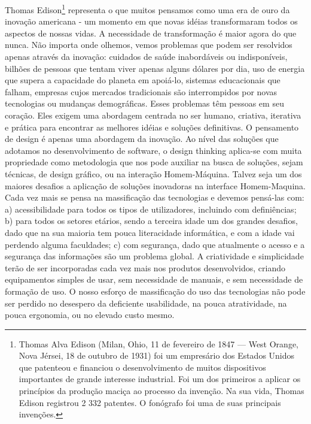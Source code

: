 \documentclass[twoside,twocolumn]{article}
\begin{document}
Thomas Edison\footnote{Thomas Alva Edison (Milan, Ohio, 11 de fevereiro de 1847 — West Orange, Nova Jérsei, 18 de outubro de 1931) foi um empresário dos Estados Unidos que patenteou e financiou o desenvolvimento de muitos dispositivos importantes de grande interesse industrial. Foi um dos primeiros a aplicar os princípios da produção maciça ao processo da invenção. Na sua vida, Thomas Edison registrou 2 332 patentes. O fonógrafo foi uma de suas principais invenções.} representa o que muitos pensamos como uma era de ouro da inovação americana - um momento em que novas idéias transformaram todos os aspectos de nossas vidas. A necessidade de transformação é maior agora do que nunca. Não importa onde olhemos, vemos problemas que podem ser resolvidos apenas através da inovação: cuidados de saúde inabordáveis ou indisponíveis, bilhões de pessoas que tentam viver apenas alguns dólares por dia, uso de energia que supera a capacidade do planeta em apoiá-lo, sistemas educacionais que falham, empresas cujos mercados tradicionais são interrompidos por novas tecnologias ou mudanças demográficas. Esses problemas têm pessoas em seu coração. Eles exigem uma abordagem centrada no ser humano, criativa, iterativa e prática para encontrar as melhores idéias e soluções definitivas. O pensamento de design é apenas uma abordagem da inovação.\citep{Brown2008}
\newline \indent Ao nível das soluções que adotamos no desenvolvimento de software, o design thinking aplica-se com muita propriedade como metodologia que nos pode auxiliar na busca de soluções, sejam técnicas, de design gráfico, ou na interação Homem-Máquina. Talvez seja um dos maiores desafios a aplicação de soluções inovadoras na interface Homem-Maquina. Cada vez mais se pensa na massificação das tecnologias e devemos pensá-las com:
\newline \indent a) acessibilidade para todos os tipos de utilizadores, incluindo com definiências; 
\newline \indent b) para todos os setores etários, sendo a terceira idade um dos grandes desafios, dado que na sua maioria tem pouca literacidade informática, e com a idade vai perdendo alguma faculdades; 
\newline \indent c) com segurança, dado que atualmente o acesso e a segurança das informações são um problema global.
\newline \indent A criatividade e simplicidade terão de ser incorporadas cada vez mais nos produtos desenvolvidos, criando equipamentos simples de usar, sem necessidade de manuais, e sem necessidade de formação de uso. O nosso esforço de massificação do uso das tecnologias não pode ser perdido no desespero da deficiente usabilidade, na pouca atratividade, na pouca ergonomia, ou no elevado custo mesmo.
\end{document}
